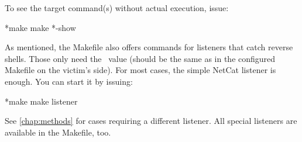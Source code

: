 To see the target command(s) without actual execution, issue:

\begin{cmdline}{*}{make}{}
make *\target*-show
\end{cmdline}

As mentioned, the Makefile also offers commands for listeners that catch reverse shells. Those only need the \port\ value (should be the same as in the configured Makefile on the victim's side). For most cases, the simple NetCat listener is enough. You can start it by issuing:

\begin{cmdline}{*}{make}{}
make listener
\end{cmdline}

See \cref{chap:methods} for cases requiring a different listener. All special listeners are available in the Makefile, too.
